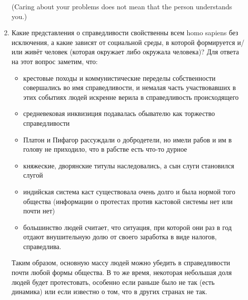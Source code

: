 \documentclass[11pt]{article}
\theoremstyle{remark}
\theoremstyle{definition}
\begin{document}
\begin{enumerate}
(Caring about your problems does not mean that the person understands you.)

\item Какие представления о справедливости свойственны всем homo sapiens без исключения, а какие зависят от социальной среды, в которой формируется и/или живёт человек (которая окружает либо окружала человека)? Для ответа на этот вопрос заметим, что:

\begin{itemize}
\item крестовые походы и коммунистические переделы собственности совершались во имя справедливости, и немалая часть участвовавших в этих событиях людей искренне верила в справедливость происходящего

\item средневековая инквизиция подавалась обывателю как торжество справедливости

\item Платон и Пифагор рассуждали о добродетели, но имели рабов и им в голову не приходило, что в рабстве есть что-то дурное

\item княжеские, дворянские титулы наследовались, а сын слуги становился слугой 

\item индийская система каст существовала очень долго и была нормой того общества (информации о протестах против кастовой системы нет или почти нет)

\item большинство людей считает, что ситуация, при которой они раз в год отдают внушительную долю от своего заработка в виде налогов, справедлива.
\end{itemize}

Таким образом, основную массу людей можно убедить в справедливости почти любой формы общества. В то же время, некоторая небольшая доля людей будет протестовать, особенно если раньше было не так (есть динамика) или если известно о том, что в других странах не так.








\end{enumerate}
\end{document}
